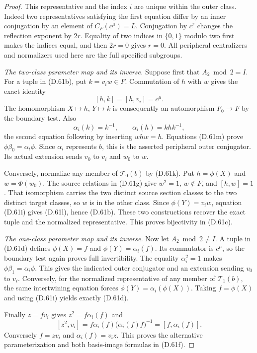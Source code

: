 \begin{proof}
This representative and the index $i$ are
unique within the outer class.
Indeed two representatives satisfying the
first equation differ by an inner conjugation
by an element of $C_F(c^\mu)=L$.
Conjugation by $c^r$ changes the reflection
exponent by $2r$. Equality of two indices in
$\{0,1\}$ modulo two first makes the indices
equal, and then $2r=0$ gives $r=0$.
All peripheral centralizers and normalizers
used here are the full specified subgroups.

\emph{The two-class parameter map and its inverse.}
Suppose first that $A_2\bmod2=I$.
For a tuple in (D.61b), put $k=v_iw\in F$.
Commutation of $h$ with $w$ gives the exact
identity
\[
                       [h,k]=[h,v_i]=c^\mu.             \tag{D.61l}
\]
The homomorphism $X\mapsto h$, $Y\mapsto k$
is consequently an automorphism $F_0\to F$
by the boundary test.
Also
\[
 \alpha_i(k)=k^{-1},\qquad
                         \alpha_i(h)=khk^{-1},           \tag{D.61m}
\]
the second equation following by inserting
$w h w=h$.
Equations (D.61m) prove
$\phi\beta_0=\alpha_i\phi$.
Since $\alpha_i$ represents $b$, this is
the asserted peripheral outer conjugator.
Its actual extension sends $v_0$ to $v_i$
and $w_0$ to $w$.

Conversely, normalize any member of
$\mathcal T_0(b)$ by (D.61k).
Put $h=\phi(X)$ and $w=\Phi(w_0)$.
The source relations in (D.61g) give
$w^2=1$, $w\notin F$, and $[h,w]=1$.
That isomorphism carries the two distinct
source section classes to the two distinct
target classes, so $w$ is in the other class.
Since $\phi(Y)=v_iw$, equation (D.61i)
gives (D.61l), hence (D.61b).
These two constructions recover the exact
tuple and the normalized representative.
This proves bijectivity in (D.61c).

\emph{The one-class parameter map and its inverse.}
Now let $A_2\bmod2\ne I$.
A tuple in (D.61d) defines
$\phi(X)=f$ and $\phi(Y)=\alpha_i(f)$.
Its commutator is $c^\mu$, so the boundary
test again proves full invertibility.
The equality $\alpha_i^2=1$ makes
$\phi\beta_1=\alpha_i\phi$.
This gives the indicated outer conjugator
and an extension sending $v_0$ to $v_i$.
Conversely, for the normalized representative
of any member of $\mathcal T_1(b)$, the same
intertwining equation forces
$\phi(Y)=\alpha_i(\phi(X))$.
Taking $f=\phi(X)$ and using (D.61i) yields
exactly (D.61d).

Finally $z=fv_i$ gives
$z^2=f\alpha_i(f)$ and
\[
 [z^2,v_i]
   =f\alpha_i(f)\bigl(\alpha_i(f)f\bigr)^{-1}
   =[f,\alpha_i(f)] .                                   \tag{D.61n}
\]
Conversely $f=zv_i$ and
$\alpha_i(f)=v_iz$.
This proves the alternative parameterization
and both basis-image formulas in (D.61f).


\end{proof}
